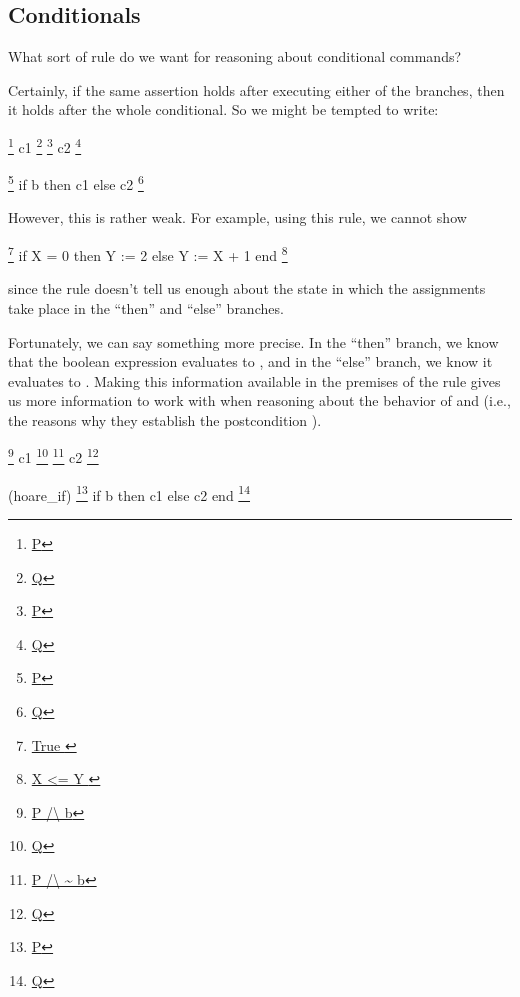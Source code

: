 \documentclass[12pt]{report}
\begin{document}
\subsection{Conditionals}



 What sort of rule do we want for reasoning about conditional
    commands?


    Certainly, if the same assertion  holds after executing
    either of the branches, then it holds after the whole conditional.
    So we might be tempted to write:


              \footnote{\url{P}} c1 \footnote{\url{Q}}
              \footnote{\url{P}} c2 \footnote{\url{Q}}
\par
\noindent\hrulefill\par
\noindent{}
      \footnote{\url{P}} if b then c1 else c2 \footnote{\url{Q}}


 However, this is rather weak. For example, using this rule,
   we cannot show


     \footnote{\url{ True }}
       if X = 0
         then Y := 2
         else Y := X + 1
       end
     \footnote{\url{ X <= Y }}


   since the rule doesn't tell us enough about the state in which the
   assignments take place in the ``then'' and ``else'' branches. 

 Fortunately, we can say something more precise.  In the
    ``then'' branch, we know that the boolean expression  evaluates to
    , and in the ``else'' branch, we know it evaluates to .
    Making this information available in the premises of the rule gives
    us more information to work with when reasoning about the behavior
    of  and  (i.e., the reasons why they establish the
    postcondition ).


              \footnote{\url{P /\   b}} c1 \footnote{\url{Q}}
              \footnote{\url{P /\ ~ b}} c2 \footnote{\url{Q}}
\par
\noindent\hrulefill\par
\noindent{}  (hoare\_if)
      \footnote{\url{P}} if b then c1 else c2 end \footnote{\url{Q}}
\end{document}

